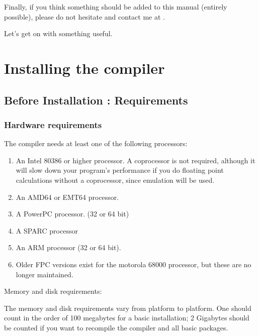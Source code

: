 Finally, if you think something should be added to this manual
(entirely possible), please do not hesitate and contact me at
.


Let's get on with something useful.


\chapter{Installing the compiler}
\label{ch:Installation}

\section{Before Installation : Requirements}

%
%
\subsection{Hardware requirements}
The compiler needs at least one of the following processors:
\begin{enumerate}
\item An Intel 80386 or higher processor. A coprocessor
is not required, although it will slow down your program's performance if you do
floating point calculations without a coprocessor, since emulation will be used.
\item An AMD64 or EMT64 processor.
\item A PowerPC processor. (32 or 64 bit)
\item A SPARC processor
\item An ARM processor (32 or 64 bit).
\item Older FPC versions exist for the motorola 68000 processor,
but these are no longer maintained.
\end{enumerate}


Memory and disk requirements:

The memory and disk requirements vary from platform to platform. One should
count in the order of 100 megabytes for a basic installation; 2 Gigabytes should
be counted if you want to recompile the compiler and all basic packages.

